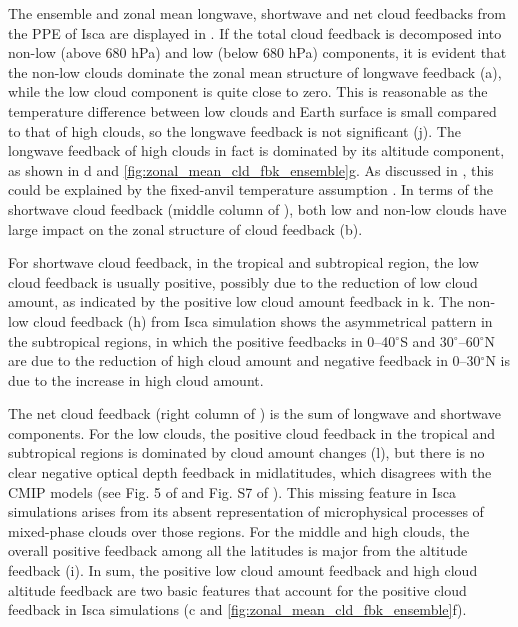 The ensemble and zonal mean longwave, shortwave and net cloud feedbacks from the PPE of Isca are displayed in . If the total cloud feedback is decomposed into non-low (above 680 hPa) and low (below 680 hPa) components, it is evident that the non-low clouds dominate the zonal mean structure of longwave feedback (a), while the low cloud component is quite close to zero. This is reasonable as the temperature difference between low clouds and Earth surface is small compared to that of high clouds, so the longwave feedback is not significant (j). The longwave feedback of high clouds in fact is dominated by its altitude component, as shown in d and \ref{fig:zonal_mean_cld_fbk_ensemble}g. As discussed in , this could be explained by the fixed-anvil temperature assumption \citep{Hartmann2002FAT}. In terms of the shortwave cloud feedback (middle column of ), both low and non-low clouds have large impact on the zonal structure of cloud feedback (b).

For shortwave cloud feedback, in the tropical and subtropical region, the low cloud feedback is usually positive, possibly due to the reduction of low cloud amount, as indicated by the positive low cloud amount feedback in k. The non-low cloud feedback (h) from Isca simulation shows the asymmetrical pattern in the subtropical regions, in which the positive feedbacks in 0--40$^\circ$S and 30$^\circ$--60$^\circ$N are due to the reduction of high cloud amount  and negative feedback in 0--30$^\circ$N is due to the increase in high cloud amount.

The net cloud feedback (right column of ) is the sum of longwave and shortwave components. For the low clouds, the positive cloud feedback in the tropical and subtropical regions is dominated by cloud amount changes (l), but there is no clear negative optical depth feedback in midlatitudes, which disagrees with the CMIP models (see Fig. 5 of \citealt{Sherwood2020} and Fig. S7 of \citealt{Zelinka2016insights}). This missing feature in Isca simulations arises from its absent representation of microphysical processes of mixed-phase clouds over those regions. For the middle and high clouds, the overall positive feedback among all the latitudes is major from the altitude feedback (i). In sum, the positive low cloud amount feedback and high cloud altitude feedback are two basic features that account for the positive cloud feedback in Isca simulations (c and \ref{fig:zonal_mean_cld_fbk_ensemble}f).

